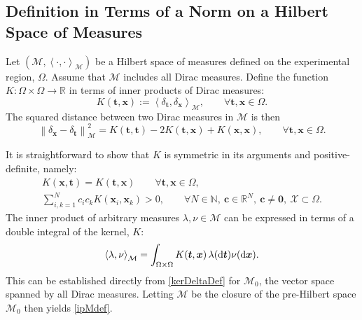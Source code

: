 \documentclass[graybox]{svmult}
\newcommand{\reals}{\mathbb{R}}
\newcommand{\vc}{\boldsymbol{c}}
\newcommand{\vx}{\boldsymbol{x}}
\newcommand{\vt}{\boldsymbol{t}}
\newcommand{\vzero}{\boldsymbol{0}}
\newcommand{\dif}{{\rm d}}
\newcommand{\Xdes}{\mathcal{X}}
\newcommand{\cm}{\mathcal{M}}
\newcommand{\ip}[3][{}]{\ensuremath{\left \langle #2, #3 \right \rangle_{#1}}}
\newcommand{\norm}[2][{}]{\ensuremath{\left \lVert #2 \right \rVert}_{#1}}
\begin{document}
\subsection{Definition in Terms of a Norm on a Hilbert Space of Measures}
\label{sec:HilbertMeasures}

Let $(\cm, \ip[\cm]{\cdot}{\cdot})$ be a Hilbert space of measures defined on the experimental region, $\Omega$.  Assume that $\cm$ includes all Dirac measures.  Define the function $K:\Omega \times \Omega \to \reals$ in terms of inner products of Dirac measures:
\begin{equation} \label{kerDeltaDef}
    K(\vt,\vx) := \ip[\cm]{\delta_{\vt}}{\delta_{\vx}}, \qquad \forall \vt, \vx \in \Omega.
\end{equation}
The squared distance between two Dirac measures in $\cm$ is then
\begin{equation} \label{distDelta}
   \norm[\cm]{\delta_{\vx} - \delta_{\vt}}^2 = K(\vt,\vt) - 2K(\vt,\vx) + K(\vx,\vx), \qquad \forall \vt, \vx \in \Omega.
\end{equation}


It is straightforward to show that $ K$ is symmetric in its arguments and positive-definite, namely:
\begin{subequations} \label{eq:sympd}
\begin{gather}
K(\vx, \vt) = K(\vt, \vx) \qquad \forall \vt, \vx\in \Omega,\\
\sum\limits_{i, k=1}^N c_i c_k  K(\vx_i,\vx_k) > 0, \qquad \forall N\in\mathbb{N}, \  \vc \in\mathbb{R}^N, \ \vc \ne \vzero,  \ \Xdes \subset \Omega.
\end{gather}
\end{subequations}
The inner product of arbitrary measures $\lambda, \nu \in \cm$ can be expressed in terms of a double integral of the kernel, $K$:
\begin{equation} \label{ipMdef}
    \ip[\cm]{\lambda}{\nu} = \int_{\Omega \times \Omega} K(\vt,\vx) \, \lambda(\dif \vt) \nu(\dif \vx).
\end{equation}
This can be established directly from \eqref{kerDeltaDef} for $\cm_0$, the vector space spanned by all Dirac measures.  Letting $\cm$ be the closure of the pre-Hilbert space $\cm_0$ then yields \eqref{ipMdef}.
\end{document}
